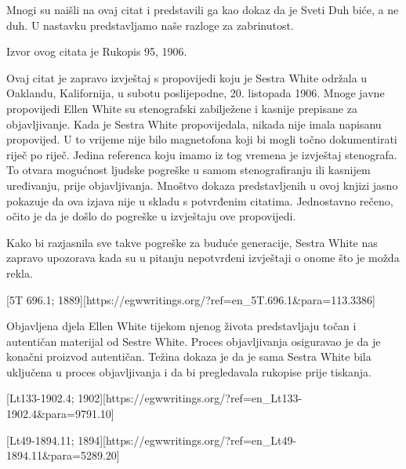 Mnogi su naišli na ovaj citat i predstavili ga kao dokaz da je Sveti Duh biće, a ne duh. U nastavku predstavljamo naše razloge za zabrinutost.

Izvor ovog citata je Rukopis 95, 1906.

Ovaj citat je zapravo izvještaj s propovijedi koju je Sestra White održala u Oaklandu, Kalifornija, u subotu poslijepodne, 20. listopada 1906. Mnoge javne propovijedi Ellen White su stenografski zabilježene i kasnije prepisane za objavljivanje. Kada je Sestra White propovijedala, nikada nije imala napisanu propovijed. U to vrijeme nije bilo magnetofona koji bi mogli točno dokumentirati riječ po riječ. Jedina referenca koju imamo iz tog vremena je izvještaj stenografa. To otvara mogućnost ljudske pogreške u samom stenografiranju ili kasnijem uređivanju, prije objavljivanja. Mnoštvo dokaza predstavljenih u ovoj knjizi jasno pokazuje da ova izjava nije u skladu s potvrđenim citatima. Jednostavno rečeno, očito je da je došlo do pogreške u izvještaju ove propovijedi.

Kako bi razjasnila sve takve pogreške za buduće generacije, Sestra White nas zapravo upozorava kada su u pitanju nepotvrđeni izvještaji o onome što je možda rekla.

[5T 696.1; 1889][https://egwwritings.org/?ref=en\_5T.696.1&para=113.3386]

Objavljena djela Ellen White tijekom njenog života predstavljaju točan i autentičan materijal od Sestre White. Proces objavljivanja osiguravao je da je konačni proizvod autentičan. Težina dokaza je da je sama Sestra White bila uključena u proces objavljivanja i da bi pregledavala rukopise prije tiskanja.

[Lt133-1902.4; 1902][https://egwwritings.org/?ref=en\_Lt133-1902.4&para=9791.10]


[Lt49-1894.11; 1894][https://egwwritings.org/?ref=en\_Lt49-1894.11&para=5289.20]


